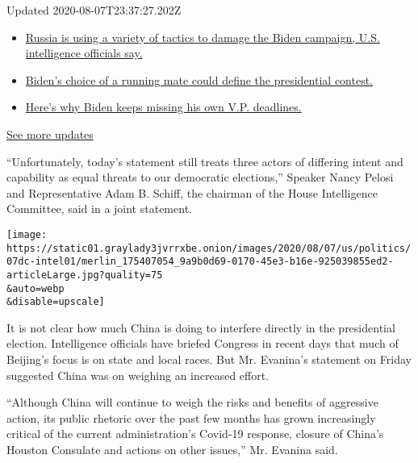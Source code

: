 Updated 2020-08-07T23:37:27.202Z

\begin{itemize}
\tightlist
\item
  \href{https://www.nytimes3xbfgragh.onion/2020/08/07/us/elections/trump-biden.html?action=click\&pgtype=Article\&state=default\&region=MAIN_CONTENT_1\&context=storylines_live_updates\#link-77a72de1}{Russia
  is using a variety of tactics to damage the Biden campaign, U.S.
  intelligence officials say.}
\item
  \href{https://www.nytimes3xbfgragh.onion/2020/08/07/us/elections/trump-biden.html?action=click\&pgtype=Article\&state=default\&region=MAIN_CONTENT_1\&context=storylines_live_updates\#link-1ab01601}{Biden's
  choice of a running mate could define the presidential contest.}
\item
  \href{https://www.nytimes3xbfgragh.onion/2020/08/07/us/elections/trump-biden.html?action=click\&pgtype=Article\&state=default\&region=MAIN_CONTENT_1\&context=storylines_live_updates\#link-4b53533c}{Here's
  why Biden keeps missing his own V.P. deadlines.}
\end{itemize}

\href{https://www.nytimes3xbfgragh.onion/2020/08/07/us/elections/trump-biden.html?action=click\&pgtype=Article\&state=default\&region=MAIN_CONTENT_1\&context=storylines_live_updates}{See
more updates}

``Unfortunately, today's statement still treats three actors of
differing intent and capability as equal threats to our democratic
elections,'' Speaker Nancy Pelosi and Representative Adam B. Schiff, the
chairman of the House Intelligence Committee, said in a joint statement.

\texttt{[image: https://static01.graylady3jvrrxbe.onion/images/2020/08/07/us/politics/07dc-intel01/merlin\_175407054\_9a9b0d69-0170-45e3-b16e-925039855ed2-articleLarge.jpg?quality=75\\\&auto=webp\\\&disable=upscale]}

It is not clear how much China is doing to interfere directly in the
presidential election. Intelligence officials have briefed Congress in
recent days that much of Beijing's focus is on state and local races.
But Mr. Evanina's statement on Friday suggested China was on weighing an
increased effort.

``Although China will continue to weigh the risks and benefits of
aggressive action, its public rhetoric over the past few months has
grown increasingly critical of the current administration's Covid-19
response, closure of China's Houston Consulate and actions on other
issues,'' Mr. Evanina said.


